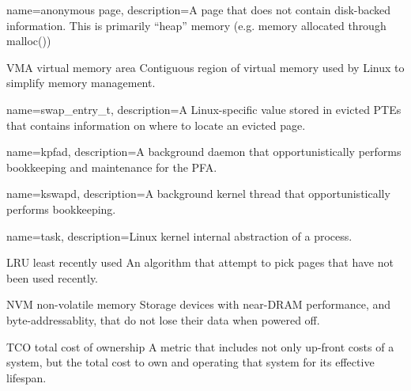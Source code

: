 {
  name={anonymous page},
  description={A page that does not contain disk-backed information. This is
primarily ``heap'' memory (e.g. memory allocated through malloc())}
}

  {VMA}
  {virtual memory area}
  {Contiguous region of virtual memory used by Linux to simplify memory
   management.}

{
  name={swap\_entry\_t},
  description={A Linux-specific value stored in evicted PTEs that contains
information on where to locate an evicted page.}
}

{
  name={kpfad},
  description={A background daemon that opportunistically performs bookkeeping
  and maintenance for the PFA.}
}

{
  name={kswapd},
  description={A background kernel thread that opportunistically performs
    bookkeeping.}
}

{
  name={task},
  description={Linux kernel internal abstraction of a process.}
}

  {LRU}
  {least recently used}
  {An algorithm that attempt to pick pages that have not been used recently.}

  {NVM}
  {non-volatile memory}
  {Storage devices with near-DRAM performance, and byte-addressablity, that do
  not lose their data when powered off.}

  {TCO}
  {total cost of ownership}
  {A metric that includes not only up-front costs of a system, but the total
  cost to own and operating that system for its effective lifespan.}
